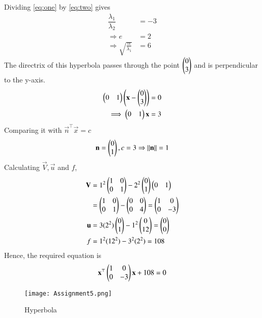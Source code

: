 \documentclass[journal,12pt,twocolumn]{IEEEtran}
\begin{document}
Dividing \eqref{eq:one} by \eqref{eq:two} gives
\begin{align}
    \dfrac{\lambda_1}{\lambda_2}&=-3\\
    \Rightarrow e&=2\\
    \Rightarrow \sqrt{\frac{\alpha}{\lambda_1}}&=6
\end{align}
The directrix of this hyperbola passes through the point $\begin{pmatrix}0\\3\end{pmatrix}$ and is perpendicular to the y-axis. 
\begin{align}
    \begin{pmatrix}0&1\end{pmatrix}\left(\mathbf{x}-\begin{pmatrix}0\\3\end{pmatrix}\right) = 0\\
    \implies \begin{pmatrix}0&1\end{pmatrix}\mathbf{x} = 3
\end{align}
Comparing it with $\vec{n}^{\top}\vec{x} = c$
\begin{align}
    \mathbf{n} = \begin{pmatrix}0\\1\end{pmatrix}, c = 3\Rightarrow \lVert\mathbf{n}\rVert = 1
\end{align}
Calculating $\vec{V}, \vec{u}$ and $f$,
\begin{align}
    \mathbf{V}&=1^2\begin{pmatrix}1&0\\0&1\end{pmatrix} - 2^2\begin{pmatrix}0\\1\end{pmatrix}\begin{pmatrix}0&1\end{pmatrix}\\
    &=\begin{pmatrix}1&0\\0&1\end{pmatrix}-\begin{pmatrix}0&0\\0&4\end{pmatrix}=\begin{pmatrix}1&0\\0&-3\end{pmatrix}\\
    \mathbf{u}&= 3(2^2)\begin{pmatrix}0\\1\end{pmatrix} - 1^2\begin{pmatrix}0\\12\end{pmatrix}=\begin{pmatrix}0\\0\end{pmatrix}\\
    f &= 1^2(12^2) - 3^2(2^2)= 108
\end{align}
Hence, the required equation is
\begin{align}
    \mathbf{x}^{\top}\begin{pmatrix}1&0\\0&-3\end{pmatrix}\mathbf{x}+108=0
\end{align}
\begin{figure}[!h]
 \centering
 \texttt{[image: Assignment5.png]}
 \caption{Hyperbola}
 \label{plot}
\end{figure}
\end{document}
